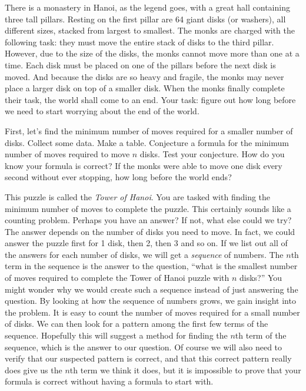 \documentclass[12pt]{article}
\begin{document}
There is a monastery in Hanoi, as the legend goes, with a great hall containing three tall pillars.  Resting on the first pillar are 64 giant disks (or washers), all different sizes, stacked from largest to smallest.  The monks are charged with the following task: they must move the entire stack of disks to the third pillar.  However, due to the size of the disks, the monks cannot move more than one at a time.  Each disk must be placed on one of the pillars before the next disk is moved.  And because the disks are so heavy and fragile, the monks may never place a larger disk on top of a smaller disk. When the monks finally complete their task, the world shall come to an end.  Your task: figure out how long before we need to start worrying about the end of the world.

\begin{activity}
\begin{questions}
\question First, let's find the minimum number of moves required for a smaller number of disks.  Collect some data. Make a table.
  \question Conjecture a formula for the minimum number of moves required to move $n$ disks.  Test your conjecture.  How do you know your formula is correct?
  \question If the monks were able to move one disk every second without ever stopping, how long before the world ends?
\end{questions}

\end{activity}


This puzzle is called the {\em Tower of Hanoi}.  You are tasked with finding the minimum number of moves to complete the puzzle.  This certainly sounds like a counting problem.  Perhaps you have an answer?  If not, what else could we try?  The answer depends on the number of disks you need to move.  In fact, we could answer the puzzle first for 1 disk, then 2, then 3 and so on.  If we list out all of the answers for each number of disks, we will get a {\em sequence} of numbers.  The $n$th term in the sequence is the answer to the question, ``what is the smallest number of moves required to complete the Tower of Hanoi puzzle with $n$ disks?''  You might wonder why we would create such a sequence instead of just answering the question.  By looking at how the sequence of numbers grows, we gain insight into the problem.  It is easy to count the number of moves required for a small number of disks.  We can then look for a pattern among the first few terms of the sequence.  Hopefully this will suggest a method for finding the $n$th term of the sequence, which is the answer to our question.  Of course we will also need to verify that our suspected pattern is correct, and that this correct pattern really does give us the $n$th term we think it does, but it is impossible to prove that your formula is correct without having a formula to start with.
\end{document}
